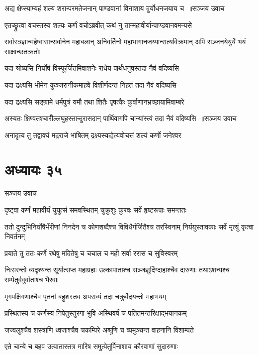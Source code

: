 \threelineshloka
{अद्य क्षेप्स्याम्यहं शल्य शरान्परमतेजनान्}
{पाण्डवानां विनाशाय दुर्योधनजयाय च ॥सञ्जय उवाच}
{}


\twolineshloka
{एतच्छ्रुत्वा वचस्तस्य शल्यः कर्णं वचोऽब्रवीत्}
{कथं नु तान्महावीर्यान्पाण्डवानवमन्यसे}


\threelineshloka
{सर्वास्त्रज्ञान्महेष्वासान्सर्वानेन महाबलान्}
{अनिवर्तिनो महाभागानजय्यान्सत्यविक्रमान्}
{अपि सञ्जनयेयुर्ये भयं साक्षाच्छतक्रतोः}


\twolineshloka
{यदा श्रोष्यसि निर्घोषं विस्फूर्जितमिवाशनेः}
{राधेय पार्थधनुषस्तदा नैवं वदिष्यसि}


\twolineshloka
{यदा द्रक्ष्यसि भीमेन कुञ्जरानीकमाहवे}
{विशीर्णदन्तं निहतं तदा नैवं वदिष्यसि}


\twolineshloka
{यदा द्रक्ष्यसि सङ्ग्रामे धर्मपुत्रं यमौ तथा}
{शितैः पृषत्कैः कुर्वाणानभ्रच्छायामिवाम्बरे}


\threelineshloka
{अस्यतः क्षिण्वतश्चारीँल्लघुहस्तान्दुरासदान्}
{पार्थिवागपि चान्यांस्त्वं तदा नैवं वदिष्यसि ॥सञ्जय उवाच}
{}


\twolineshloka
{अनादृत्य तु तद्वाक्यं मद्रराजे भाषितम्}
{द्रक्ष्यस्यद्येत्यवोचत्तं शल्यं कर्णो जनेश्वर}


\chapter{अध्यायः ३५}
\twolineshloka
{सञ्जय उवाच}
{}


\twolineshloka
{दृष्ट्वा कर्णं महावीर्यं युयुत्सं समवस्थितम्}
{चुक्रुशुः कुरवः सर्वे हृष्टरूपाः समन्ततः}


\threelineshloka
{ततो दुन्दुभिनिर्घोषैर्भेरीणां निनदेन च}
{कोणशब्दैश्च विविधैर्गर्जितैश्च तरस्विनाम्}
{निर्ययुस्तावकाः सर्वे मृत्युं कृत्वा निवर्तनम्}


\twolineshloka
{प्रयाते तु ततः कर्णे रथेषु मदितेषु च}
{चचाल च मही सर्वा ररास च सुविस्वरम्}


निःसरन्तो व्यदृश्यन्त सूर्यात्सप्त महाग्रहाः
\twolineshloka
{उल्कापाताश्च सञ्जज्ञुर्दिग्दाहाश्चैव दारुणाः}
{तथाऽशन्यश्च सम्पेतुर्ववुर्वाताश्च भैरवाः}


\twolineshloka
{मृगपक्षिगणाश्चैव पृतनां बहुशस्तव}
{अपसव्यं तदा चक्रुर्वेदयन्तो महाभयम्}


\twolineshloka
{प्रस्थितस्य च कर्णस्य निपेतुस्तुरगा भुवि}
{अस्थिवर्षं च पतितमन्तरिक्षाद्भयानकम्}


\twolineshloka
{जज्वलुश्चैव शस्त्राणि ध्वजाश्चैव चकम्पिरे}
{अश्रूणि च व्यमुञ्चन्त वाहनानि विशाम्पते}


\twolineshloka
{एते चान्ये च बहव उत्पातास्तत्र मारिष}
{समुत्पेतुर्विनाशाय कौरवाणां सुदारुणाः}


